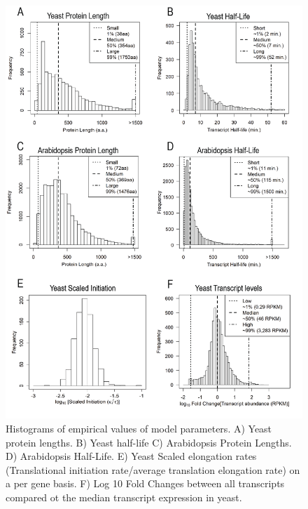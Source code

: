 \documentclass[a4,center,fleqn,nocrop]{NAR}
\begin{document}
\begin{figure}[!ht]
\begin{center}
\includegraphics[width=120mm]{Images/2023-07-04_parameter_histograms.png}
\caption{Histograms of empirical values of model parameters. A) Yeast protein lengths. B) Yeast half-life C) Arabidopsis Protein Lengths. D) Arabidopsis Half-Life. E) Yeast Scaled elongation rates (Translational initiation rate/average translation elongation rate) on a per gene basis. F) Log 10 Fold Changes between all transcripts compared ot the median transcript expression in yeast. }
\end{center}
\end{figure}


\end{document}
